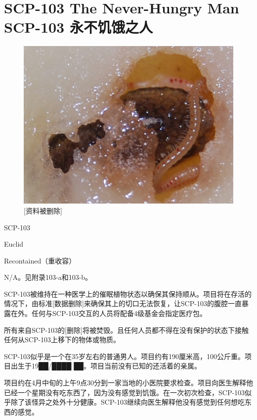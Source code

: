 \chapter[SCP-103 永不饥饿之人]{
    SCP-103 The Never-Hungry Man\\
    SCP-103 永不饥饿之人
}

\label{chap:SCP-103}

\begin{figure}[H]
    \centering
    \includegraphics[width=0.5\linewidth]{images/SCP.103.jpg}
    \caption*{{[}资料被删除]}
\end{figure}

SCP-103

Euclid

Recontained（重收容）


N\slash A。见附录103-a和103-b。

SCP-103被维持在一种医学上的催眠植物状态以确保其保持顺从。项目将在存活的情况下，由标准{[}数据删除]来确保其上的切口无法恢复，让SCP-103的腹腔一直暴露在外。任何与SCP-103交互的人员将配备4级基金会指定医疗包。

所有来自SCP-103的{[}删除]将被焚毁。且任何人员都不得在没有保护的状态下接触任何从SCP-103上移下的物体或物质。

SCP-103似乎是一个在35岁左右的普通男人。项目约有190厘米高，100公斤重。项目出生于19██\slash ████ ██。项目当前没有已知的还活着的亲属。

项目约在4月中旬的上午9点30分到一家当地的小医院要求检查。项目向医生解释他已经一个星期没有吃东西了，因为没有感觉到饥饿。在一次初次检查，SCP-103似乎除了该怪异之处外十分健康。SCP-103继续向医生解释他没有感觉到任何想吃东西的感觉。


